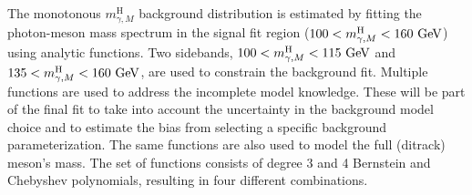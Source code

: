 \newpage
The monotonous $m^{\text{H}}_{\gamma, M}$ background distribution is estimated by fitting the photon-meson mass spectrum in the signal fit region ($100 < m^{\text{H}}_{\gamma, M} < 160\ \text{GeV}$) using analytic functions. Two sidebands, $100 < m^{\text{H}}_{\gamma, M} < 115\ \text{GeV}$ and $135 < m^{\text{H}}_{\gamma, M} < 160\ \GeV$, are used to constrain the background fit. Multiple functions are used to address the incomplete model knowledge. These will be part of the final fit to take into account the uncertainty in the background model choice and to estimate the bias from selecting a specific background parameterization. The same functions are also used to model the full (ditrack) meson's mass. The set of functions consists of degree 3 and 4 Bernstein and Chebyshev polynomials, resulting in four different combinations. 

